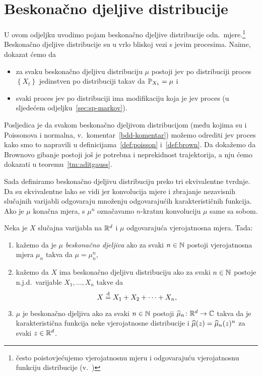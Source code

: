 \documentclass[main.tex]{subfiles}
\begin{document}
\nocite{*}

\section{Beskonačno djeljive distribucije} \label{sec:sp-bdd}
U ovom odjeljku uvodimo pojam beskonačno djeljive distribucije odn.\ mjere.\footnote{često poistovjećujemo vjerojatnosnu
	mjeru i odgovarajuću vjerojatnosnu funkciju distribucije (v.~\cite[str.~257]{sarapa})} Beskonačno djeljive
distribucije su u vrlo bliskoj vezi s \levy jevim procesima. Naime, dokazat ćemo da
\begin{itemize}
	\item za svaku beskonačno djeljivu distribuciju \( \mu \) postoji \levy jev po distribuciji proces \( \left\{ X_t \right\} \)
	      jedinstven po distribuciji takav da \( \P_{X_1} = \mu \) i
	\item svaki proces \levy jev po distribuciji ima modifikaciju koja je \levy jev proces (u sljedećem odjeljku~\ref{sec:sp-markov}).
\end{itemize}
Posljedica je da svakom beskonačno djeljivom distribucijom (među kojima su i Poissonova i normalna, v.\ komentar~\ref{bdd-komentar}) možemo
odrediti \levy jev proces kako smo to napravili u definicijama~\ref{def:poisson} i~\ref{def:brown}. Da dokažemo
da Brownovo gibanje postoji još je potrebna i neprekidnost trajektorija, a nju ćemo dokazati u teoremu~\ref{tm:aditgauss}.

Sada definiramo beskonačno djeljivu distribuciju preko tri ekvivalentne tvrdnje. Da su ekvivalentne lako se vidi
jer konvolucija mjere i zbrajanje nezavisnih slučajnih varijabli odgovaraju množenju odgovarajućih karakterističnih funkcija.
Ako je \( \mu \) konačna mjera, s \( \mu^n \) označavamo \( n \)-kratnu konvoluciju \( \mu \) same sa sobom.

\begin{definicija} \label{deF:bdd}
	Neka je \( X \) slučajna varijabla na \( \R^d \) i \( \mu \) odgovarajuća vjerojatnosna mjera. Tada:
	\begin{enumerate}[label=(\roman*)]
		\item kažemo da je \( \mu \) \emph{beskonačno djeljiva} ako za svaki \( n \in \N \) postoji vjerojatnosna mjera \( \mu_n \)
		      takva da \( \mu = \mu_n^n \),
		\item kažemo da \( X \) ima beskonačno djeljivu distribuciju ako za svaki \( n \in \N \) postoje n.j.d.\ varijable \( X_1, \ldots, X_n \)
		      takve da \label{item:defbdd2}
		      \[
			      X \jpod X_1 + X_2 + \cdots + X_n,
		      \]
		\item \( \mu \) je beskonačno djeljiva ako za svaki \( n \in \N \) postoji \( \wh \mu_n \colon \R^d \to \C \)
		      takva da je karakteristična funkcija neke vjerojatnosne distribucije i \( \wh \mu (z) = \wh \mu_n(z)^n \) za svaki \( z \in \R^d \).
	\end{enumerate}
\end{definicija}
\end{document}
